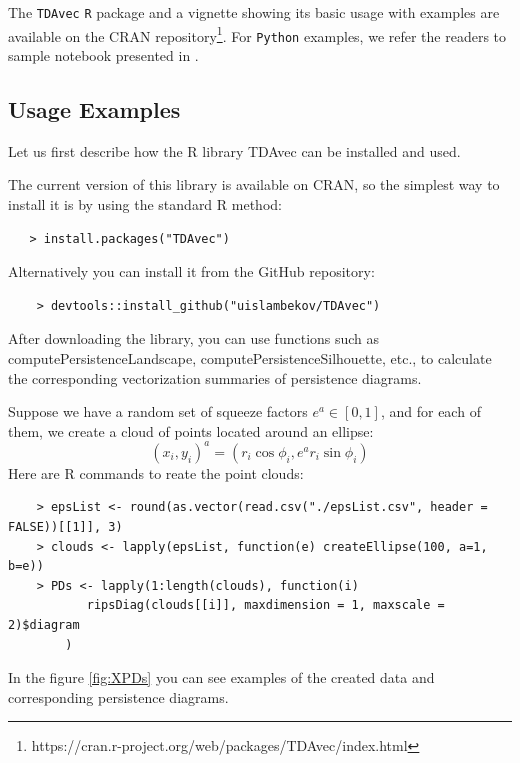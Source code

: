\documentclass[conference, onecolumn]{IEEEtran}
\begin{document}
 
The \texttt{TDAvec} \texttt{R} package and a vignette showing its basic usage with examples are available on the CRAN repository\footnote{https://cran.r-project.org/web/packages/TDAvec/index.html}. For \texttt{Python} examples, we refer the readers to sample notebook presented in \cite{pyTDAvec:2024}. 



\subsection{Usage Examples}

Let us first describe how the R library TDAvec can be installed and used.

The current version of this library is available on CRAN, so the simplest way to install it is by using the standard R method:

\begin{verbatim}
   > install.packages("TDAvec") 
\end{verbatim}

Alternatively you can install it from the GitHub repository:

\begin{verbatim}
    > devtools::install_github("uislambekov/TDAvec")
\end{verbatim}

After downloading the library, you can use functions such as computePersistenceLandscape, computePersistenceSilhouette, etc., to calculate the corresponding vectorization summaries of persistence diagrams.

Suppose we have a random set of squeeze factors $e^a \in [0,1]$, and for each of them, we create a cloud of points located around an ellipse:
$$
(x_i, y_i)^a = ( r_i \cos\phi_i, e^a r_i\sin\phi_i)
$$
Here are R commands to reate the point clouds:
\begin{verbatim}
    > epsList <- round(as.vector(read.csv("./epsList.csv", header = FALSE))[[1]], 3)
    > clouds <- lapply(epsList, function(e) createEllipse(100, a=1, b=e))
    > PDs <- lapply(1:length(clouds), function(i) 
           ripsDiag(clouds[[i]], maxdimension = 1, maxscale = 2)$diagram
        )
\end{verbatim}
In the figure \ref{fig:XPDs} you can see examples of the created data and corresponding persistence diagrams.
\end{document}
